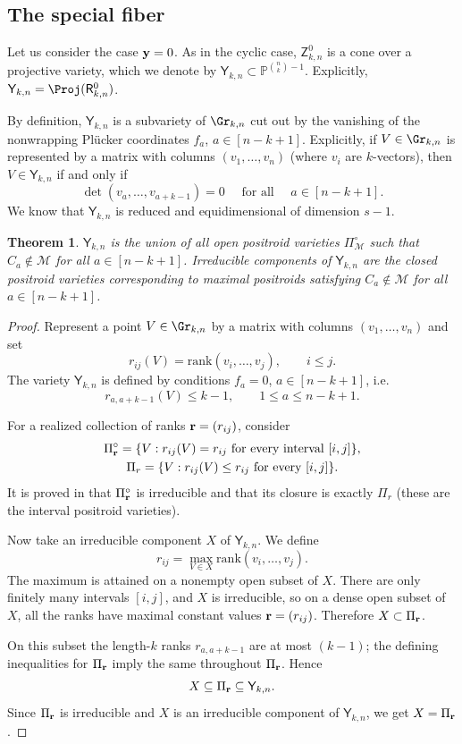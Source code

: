 \documentclass[11pt]{amsart}
\numberwithin{equation}{section}
\newtheorem{thm}{Theorem}[section]
\newcommand{\bP}{{\mathbb P}}
\newcommand{\bfy}{{\bf y}}
\begin{document}
\subsection{The special fiber}
Let us consider the case $\bfy=0$. As in the cyclic case, 
${\mathsf Z}_{k,n}^0$ is a cone over a projective variety, which we denote by 
${\mathsf Y}_{k,n}\subset \bP^{\binom{n}{k}-1}$. Explicitly, 
${\mathsf Y}_{k,n} = \Proj({\mathsf R}_{k,n}^{0})$.

By definition, ${\mathsf Y}_{k,n}$ is a subvariety of $\Gr_{k,n}$ cut out by 
the vanishing of the nonwrapping Pl\"ucker coordinates $f_a$, $a\in [n-k+1]$.
Explicitly, if $V\in \Gr_{k,n}$ is represented by a matrix with columns $(v_1,\ldots,v_n)$
(where $v_i$ are $k$-vectors), then $V\in {\mathsf Y}_{k,n}$ if and only if 
$$\det(v_a,\dots,v_{a+k-1}) = 0\quad \text{ for all }\quad  a\in [n-k+1].$$
We know that ${\mathsf Y}_{k,n}$ is reduced and equidimensional of dimension $s-1$. 

\begin{thm}
${\mathsf Y}_{k,n}$ is the union of all open positroid varieties $\Pi^\circ_{\mathcal M}$  
such that $C_a\notin\mathcal M$ for all $a\in [n-k+1]$. Irreducible components of
${\mathsf Y}_{k,n}$ are the closed positroid varieties corresponding to maximal positroids 
satisfying $C_a\notin\mathcal M$ for all $a\in [n-k+1]$.
\end{thm}
\begin{proof}
Represent a point  $V\in \Gr_{k,n}$ by a matrix with columns $(v_1,\ldots,v_n)$ and set
\[
r_{ij}(V)=\mathrm{rank}(v_i,\ldots,v_j), \qquad i\le j.
\]
The variety ${\mathsf Y}_{k,n}$  is defined by conditions $f_a=0$, $a\in [n-k+1]$, i.e.
\[
r_{a,a+k-1}(V)\le k-1, \qquad 1\le a\le n-k+1.
\]

For a realized collection of ranks ${\bf r}=(r_{ij})$, consider
\begin{gather*}
\Pi_{\bf r}^\circ=\{V: r_{ij}(V) = r_{ij}\text{ for every interval }[i,j]\},\\
\Pi_r=\{V: r_{ij}(V)\le r_{ij}\text{ for every }[i,j]\}.
\end{gather*}
It is proved in \cite{Kn14} that $\Pi_{\bf r}^\circ$ is irreducible and that its closure 
is exactly $\Pi_r$ (these are the interval positroid varieties). 

Now take an irreducible component $X$ of ${\mathsf Y}_{k,n}$. 
We define 
\[
r_{ij}=\max_{V\in X}\mathrm{rank}(v_i,\ldots,v_j).
\]
The maximum is attained on a nonempty open subset of $X$. There are only finitely 
many intervals $[i,j]$, and $X$ is irreducible, so on a dense open subset of $X$, 
all the ranks have maximal constant values ${\bf r}=(r_{ij})$. Therefore $X\subset \Pi_{\bf r}$.

On this subset the length-$k$ ranks $r_{a,a+k-1}$ are at most $(k-1)$; the defining inequalities 
for $\Pi_{\bf r}$ imply the same throughout $\Pi_{\bf r}$. Hence
\[
X\subseteq\Pi_{\bf r}\subseteq {\mathsf Y}_{k,n}.
\]
Since $\Pi_{\bf r}$ is irreducible and $X$ is an irreducible component of ${\mathsf Y}_{k,n}$, 
we get $X=\Pi_{\bf r}$.  
\end{proof}
\end{document}
